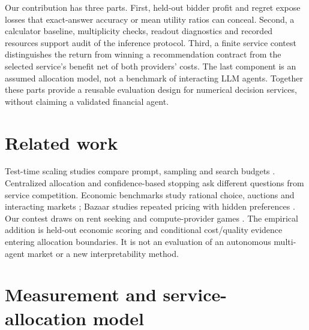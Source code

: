\documentclass[sigconf,anonymous,nonacm]{acmart}
\begin{document}
Our contribution has three parts. First, held-out bidder profit and regret expose losses that exact-answer accuracy or mean utility ratios can conceal. Second, a calculator baseline, multiplicity checks, readout diagnostics and recorded resources support audit of the inference protocol. Third, a finite service contest distinguishes the return from winning a recommendation contract from the selected service's benefit net of both providers' costs. The last component is an assumed allocation model, not a benchmark of interacting LLM agents. Together these parts provide a reusable evaluation design for numerical decision services, without claiming a validated financial agent.
\section{Related work}
Test-time scaling studies compare prompt, sampling and search budgets \citep{wei2022chain,snell2024scaling,wu2024inference,alomrani2025budget}. Centralized allocation \citep{wan2026shadowprice} and confidence-based stopping \citep{jurayj2025finalanswer} ask different questions from service competition. Economic benchmarks study rational choice, auctions and interacting markets \citep{fish2025econevals,chen2024aucarena,zhu2024synthetic}; Bazaar studies repeated pricing with hidden preferences \citep{ahmed2026bazaar}. Our contest draws on rent seeking \citep{tullock1980efficient} and compute-provider games \citep{artola2026games}. The empirical addition is held-out economic scoring and conditional cost/quality evidence entering allocation boundaries. It is not an evaluation of an autonomous multi-agent market or a new interpretability method.
\section{Measurement and service-allocation model}
\label{sec:framework}
\end{document}
